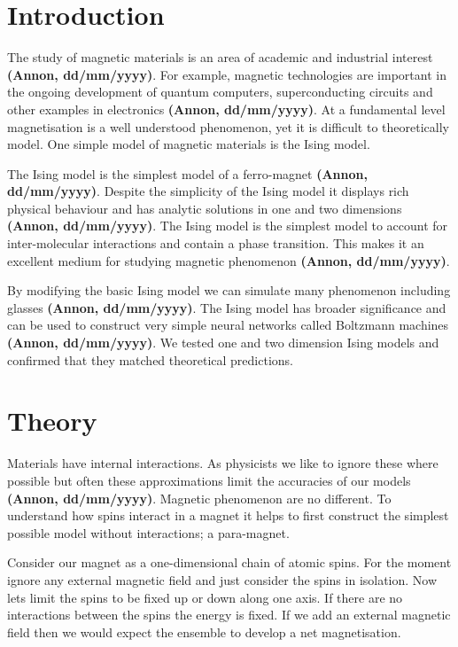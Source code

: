 \documentclass[a4paper]{article}
\def\citation{{\bfseries (Annon, dd/mm/yyyy)}}
\begin{document}
    \begin{multicols}{2}
    \section*{Introduction}
        The study of magnetic materials is an area of academic %
        and industrial interest \citation. For example, magnetic %
        technologies are important in the ongoing development of %
        quantum computers, superconducting circuits and other %
        examples in electronics \citation. At a fundamental level %
        magnetisation is a well understood phenomenon, yet it is %
        difficult to theoretically model. One simple model of magnetic %
        materials is the Ising model. 


        The Ising model is the simplest model of a ferro-magnet \citation. %
        Despite the simplicity of the Ising model it displays rich %
        physical behaviour and has analytic solutions in one and %
        two dimensions \citation.  The Ising model is the simplest model %
        to account for inter-molecular interactions and contain a phase %
        transition. This makes it an excellent medium for studying %
        magnetic phenomenon \citation. 


        By modifying the basic Ising model we can simulate many %
        phenomenon including glasses \citation. The Ising model %
        has broader significance and can be used to construct very %
        simple neural networks called Boltzmann machines \citation. We tested %
        one and two dimension Ising models and confirmed that they %
        matched theoretical predictions.


    \section*{Theory}
        Materials have internal interactions. As physicists we like %
        to ignore these where possible but often these approximations %
        limit the accuracies of our models \citation. Magnetic %
        phenomenon are no different. To understand how spins interact %
        in a magnet it helps to first construct the simplest possible %
        model without interactions; a para-magnet.


        Consider our magnet as a one-dimensional chain of atomic spins. %
        For the moment ignore any external magnetic field and just %
        consider the spins in isolation. Now lets limit the spins to %
        be fixed up or down along one axis. If there are no interactions %
        between the spins the energy is fixed. If we add an external %
        magnetic field then we would expect the ensemble to develop a %
        net magnetisation.



\end{multicols}
\end{document}
